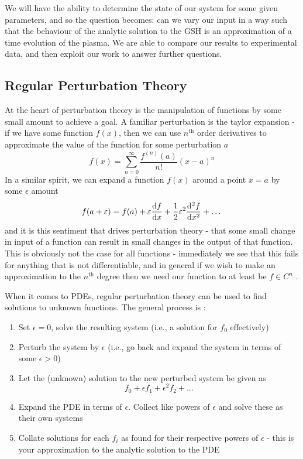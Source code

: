 We will have the ability to determine the 
state of our system for some given parameters, and so the question becomes: can 
we vary our input in a way such that the behaviour of the analytic solution to 
the GSH is an approximation of a time evolution of the plasma. We are able to compare 
our results to experimental data, and then exploit our work to answer further questions.



\subsection{Regular Perturbation Theory}

At the heart of perturbation theory is the manipulation of functions by some small amount to achieve a goal. A familiar 
perturbation is the taylor expansion - if we have some function $f(x)$, then we can use $n^{\text{th}}$ order derivatives to approximate 
the value of the function for some perturbation $a$
\begin{equation*}
    f(x) = \sum_{n = 0}^{\infty} \frac{f^{(n)}(a)}{n!} (x - a)^n
\end{equation*}
In a similar spirit, we can expand a function $f(x)$ around a point $x = a$ by some $\epsilon$ amount
$$f(a + \varepsilon) = f(a) + \varepsilon \dv{f}{x}(a) + \frac{1}{2} \varepsilon^2 \dv[2]{f}{x}(a) + \dots$$
and it is this sentiment that drives perturbation theory - that some small change in input of a function can result 
in small changes in the output of that function. This is obviously not the case for all functions - immediately we see that this 
fails for anything that is not differentiable, and in general if we wish to make an approximation to the $n^{\text{th}}$ degree then 
we need our function to at least be $f \in C^n$ \cite{perturbation-basics}. 

When it comes to PDEs, regular perturbation theory can be used to find solutions to unknown functions. The general process is \cite{perturbation-basics}:
\begin{enumerate}
    \item Set $\epsilon = 0$, solve the resulting system (i.e., a solution for $f_0$ effectively)
    \item Perturb the system by $\epsilon$ (i.e., go back and expand the system in terms of some $\epsilon > 0$)
    \item Let the (unknown) solution to the new perturbed system be given as
    $$f_0 + \epsilon f_1 + \epsilon^2 f_2 + \dots$$
    \item Expand the PDE in terms of $\epsilon$. Collect like powers of $\epsilon$ and solve these as their own systems
    \item Collate solutions for each $f_i$ as found for their respective powers of $\epsilon$ - this is your approximation 
    to the analytic solution to the PDE
\end{enumerate}


